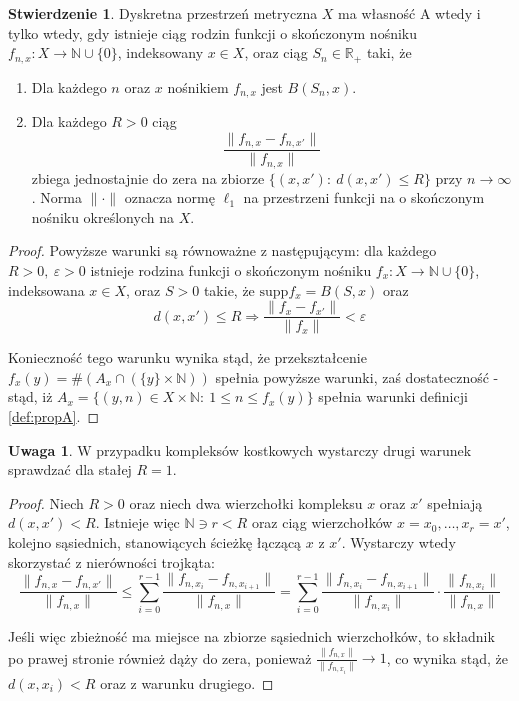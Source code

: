\documentclass[licencjacka]{pracamgr}
\theoremstyle{definition}
\theoremstyle{definition}
\newtheorem{remark}{Uwaga}[section]
\theoremstyle{definition}
\newtheorem{proposition}{Stwierdzenie}[section]
\theoremstyle{definition}
\theoremstyle{definition}
\theoremstyle{plain}
\theoremstyle{plain}
\begin{document}
\begin{proposition}\label{classification}
	Dyskretna przestrzeń metryczna $ X $ ma własność A wtedy i tylko wtedy, gdy 
	istnieje ciąg rodzin funkcji o skończonym nośniku $ f_{n,x} : X \rightarrow \mathbb{N}
	\cup \{0\} $, indeksowany $ x \in X $, oraz ciąg $ S_n \in \mathbb{R}_{+} $ taki, że
	\begin{enumerate}
		\item Dla każdego $ n $ oraz $ x $ nośnikiem $ f_{n,x} $ jest $ B(S_n, x) $.
		\item Dla każdego $ R > 0 $ ciąg $$ \frac{\| f_{n,x} - f_{n,x'} \|}{\| f_{n,x} \|} $$
		zbiega jednostajnie do zera na zbiorze $ \{ (x,x'): ~ d(x,x') \leq R\} $ przy 
		$ n \rightarrow \infty $. Norma $ \| \cdot \| $ oznacza normę $ \ell_1 $ na 
		przestrzeni funkcji na o skończonym nośniku określonych na $ X $.
	\end{enumerate}
\end{proposition}
\begin{proof}
	Powyższe warunki są równoważne z następującym: dla każdego $ R>0, ~ \varepsilon > 0 $ 
	istnieje rodzina funkcji o skończonym nośniku $ f_x : X \rightarrow \mathbb{N} \cup 
	\{0\}$, indeksowana $ x \in X $, oraz $ S > 0 $ takie, że $ \text{supp}{f_x} = B(S,x)  $ 
	oraz $$ d(x,x') \leq R \Rightarrow \frac{\| f_x - f_{x'} \|}{\|f_x \|} < \varepsilon $$

	Konieczność tego warunku wynika stąd, że przekształcenie $ f_x(y) = \#\left( A_x \cap \left( 
	\{y\} \times \mathbb{N} \right) \right) $ spełnia powyższe warunki, zaś dostateczność - 
	stąd, iż $ A_x = \{(y,n) \in X \times \mathbb{N} : ~ 1 \leq n \leq f_x(y) \} $ spełnia 
	warunki definicji \ref{def:propA}.
\end{proof}

\begin{remark}
	W przypadku kompleksów kostkowych wystarczy drugi warunek sprawdzać dla stałej 
	$ R = 1 $.
\end{remark}
\begin{proof}
	Niech $ R > 0 $ oraz niech dwa wierzchołki kompleksu $ x $ oraz $ x' $ spełniają 
	$d(x,x') < R $. Istnieje więc $ \mathbb{N} \ni  r < R $ oraz ciąg wierzchołków 
	$ x = x_0, \dots, x_r = x' $, kolejno sąsiednich, stanowiących ścieżkę łączącą 
	$ x $ z $ x' $. Wystarczy wtedy skorzystać z nierówności trojkąta:
	$$ \frac{ \| f_{n,x} - f_{n,x'}\|}{\| f_{n,x}\|} \leq \sum\limits_{i=0}^{r-1}
	\frac{ \| f_{n,x_i} - f_{n,x_{i+1}}\|}{\|f_{n,x}\|} = 
	\sum\limits_{i=0}^{r-1} \frac{ \| f_{n,x_i} - f_{n,x_{i+1}}\|}{\|f_{n,x_i}\|}\cdot
	\frac{\|f_{n,x_i}\|}{\|f_{n,x}\|}$$
	
	Jeśli więc zbieżność ma miejsce na zbiorze sąsiednich wierzchołków, to składnik po 
	prawej stronie również dąży do zera, ponieważ $ \frac{\|f_{n,x}\|}{\|f_{n,x_i}\|} 
	\rightarrow 1$, co wynika stąd, że $ d(x,x_i) < R $ oraz z warunku drugiego.
\end{proof}
\end{document}
